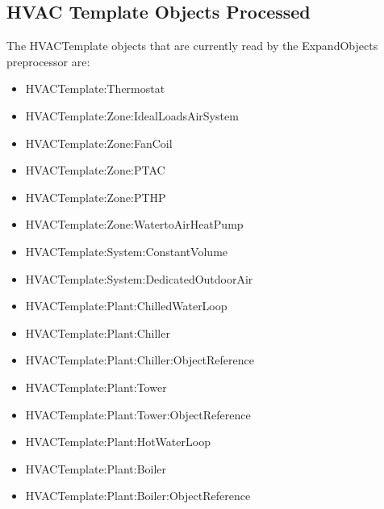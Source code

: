 \subsection{HVAC Template Objects Processed}\label{hvac-template-objects-processed}

The HVACTemplate objects that are currently read by the ExpandObjects preprocessor are:

\begin{itemize}
\item
  HVACTemplate:Thermostat
\item
  HVACTemplate:Zone:IdealLoadsAirSystem
\item
  HVACTemplate:Zone:FanCoil
\item
  HVACTemplate:Zone:PTAC
\item
  HVACTemplate:Zone:PTHP
\item
  HVACTemplate:Zone:WatertoAirHeatPump
\item
  HVACTemplate:System:ConstantVolume
\item
  HVACTemplate:System:DedicatedOutdoorAir
\item
  HVACTemplate:Plant:ChilledWaterLoop
\item
  HVACTemplate:Plant:Chiller
\item
  HVACTemplate:Plant:Chiller:ObjectReference
\item
  HVACTemplate:Plant:Tower
\item
  HVACTemplate:Plant:Tower:ObjectReference
\item
  HVACTemplate:Plant:HotWaterLoop
\item
  HVACTemplate:Plant:Boiler
\item
  HVACTemplate:Plant:Boiler:ObjectReference
\end{itemize}